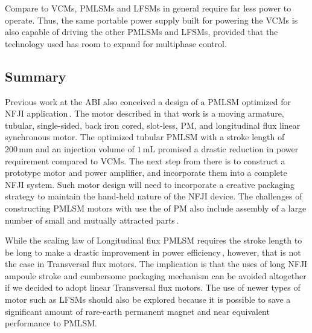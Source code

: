         
        
        Compare to \acsp{VCM}, \acsp{PMLSM} and \acsp{LFSM} in general require far less power to operate. Thus, the same portable power supply built for powering the \acsp{VCM} is also capable of driving the other \acsp{PMLSM} and \acsp{LFSM}, provided that the technology used has room to expand for multiphase control.
        
        
    \subsection{Summary}                         \label{Chapter:background/linear synchronous motors for NFJI/summary}
        
        
        Previous work at the ABI also conceived a design of a \ac{PMLSM} optimized for \acs{NFJI} application\,\cite{Ruddy2015}. The motor described in that work is a moving armature, tubular, single-sided, back iron cored, slot-less, \acs{PM}, and longitudinal flux linear synchronous motor. The optimized tubular \acs{PMLSM} with a stroke length of $\mathrm{200\,mm}$ and an injection volume of $\mathrm{1\,mL}$ promised a drastic reduction in power requirement compared to \acsp{VCM}. The next step from there is to construct a prototype motor and power amplifier, and incorporate them into a complete \acs{NFJI} system. Such motor design will need to incorporate a creative packaging strategy to maintain the hand-held nature of the \acs{NFJI} device. The challenges of constructing \acs{PMLSM} motors with use the of PM also include assembly of a large number of small and mutually attracted parts\,\cite{Hwang2012,Shin2012}.
        
        
        While the scaling law of Longitudinal flux \acs{PMLSM} requires the stroke length to be long to make a drastic improvement in power efficiency\,\cite{Laithwaite1970}, however, that is not the case in Transversal flux motors. The implication is that the uses of long \acs{NFJI} ampoule stroke and cumbersome packaging mechanism can be avoided altogether if we decided to adopt linear Transversal flux motors. The use of newer types of motor such as \acsp{LFSM} should also be explored because it is possible to save a significant amount of rare-earth permanent magnet and near equivalent performance to \acs{PMLSM}.


